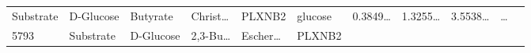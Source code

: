 \documentclass[
]{article}
\begin{document}
\begin{longtable}[]{@{}lllllllllll@{}}
\begin{minipage}[t]{0.07\columnwidth}
Substrate\strut
\end{minipage} & \begin{minipage}[t]{0.07\columnwidth}\raggedright
D-Glucose\strut
\end{minipage} & \begin{minipage}[t]{0.09\columnwidth}\raggedright
Butyrate\strut
\end{minipage} & \begin{minipage}[t]{0.07\columnwidth}\raggedright
Christ\ldots{}\strut
\end{minipage} & \begin{minipage}[t]{0.07\columnwidth}\raggedright
PLXNB2\strut
\end{minipage} & \begin{minipage}[t]{0.09\columnwidth}\raggedright
glucose\strut
\end{minipage} & \begin{minipage}[t]{0.07\columnwidth}\raggedright
0.3849\ldots{}\strut
\end{minipage} & \begin{minipage}[t]{0.07\columnwidth}\raggedright
1.3255\ldots{}\strut
\end{minipage} & \begin{minipage}[t]{0.07\columnwidth}\raggedright
3.5538\ldots{}\strut
\end{minipage} & \begin{minipage}[t]{0.03\columnwidth}\raggedright
\ldots{}\strut
\end{minipage}\tabularnewline
\begin{minipage}[t]{0.03\columnwidth}\raggedright
5793\strut
\end{minipage} & \begin{minipage}[t]{0.07\columnwidth}\raggedright
Substrate\strut
\end{minipage} & \begin{minipage}[t]{0.07\columnwidth}\raggedright
D-Glucose\strut
\end{minipage} & \begin{minipage}[t]{0.09\columnwidth}\raggedright
2,3-Bu\ldots{}\strut
\end{minipage} & \begin{minipage}[t]{0.07\columnwidth}\raggedright
Escher\ldots{}\strut
\end{minipage} & \begin{minipage}[t]{0.07\columnwidth}\raggedright
PLXNB2\strut
\end{minipage} & \begin{minipage}[t]{0.09\columnwidth}\raggedright

\end{minipage}
\end{longtable}
\end{document}
